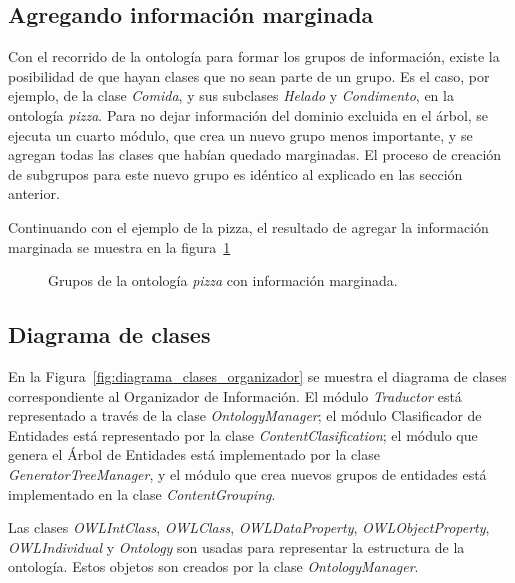\subsection{Agregando información marginada}
Con el recorrido de la ontología para formar los grupos de información, existe la posibilidad de que hayan clases que no sean parte de un grupo. Es el caso, por ejemplo, de la clase \emph{Comida}, y sus subclases \emph{Helado} y \emph{Condimento}, en la ontología \emph{pizza}. Para no dejar información del dominio excluida en el árbol, se ejecuta un cuarto módulo, que crea un nuevo grupo menos importante, y se agregan todas las clases que habían quedado marginadas. El proceso de creación de subgrupos para este nuevo grupo es idéntico al explicado en las sección anterior.

Continuando con el ejemplo de la pizza, el resultado de agregar la  información marginada se muestra en la figura~\ref{fig:macro_planning_pizza_marg}

\begin{figure}[H]
\centering
\begin{minipage}[c]{0.7\textwidth}
{\footnotesize 
{}
}
\caption{Grupos de la ontología \emph{pizza} con información marginada.}
\label{fig:macro_planning_pizza_marg}
\end{minipage}
\end{figure}

\subsection{Diagrama de clases}
En la Figura~\ref{fig:diagrama_clases_organizador} se muestra el diagrama de clases correspondiente al Organizador de Información. El módulo \emph{Traductor} está representado a través de la clase \emph{OntologyManager}; el módulo Clasificador de Entidades está representado por la clase \emph{ContentClasification}; el módulo que genera el Árbol de Entidades está implementado por la clase \emph{GeneratorTreeManager}, y el módulo que crea nuevos grupos de entidades está implementado en la clase \emph{ContentGrouping}. 

Las clases \emph{OWLIntClass},  \emph{OWLClass},  \emph{OWLDataProperty},  \emph{OWLObjectProperty}, \emph{OWLIndividual} y  \emph{Ontology} son usadas para representar la estructura de la ontología. Estos objetos son creados por la clase  \emph{OntologyManager}. 

